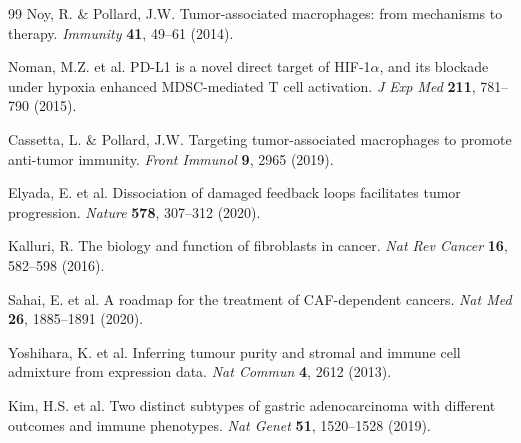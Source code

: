 \documentclass[12pt,twoside]{article}
\begin{document}
\begin{thebibliography}{99}
 Noy, R. \& Pollard, J.W. Tumor-associated macrophages: from mechanisms to therapy. \textit{Immunity} \textbf{41}, 49--61 (2014).

 Noman, M.Z. et al. PD-L1 is a novel direct target of HIF-1$\alpha$, and its blockade under hypoxia enhanced MDSC-mediated T cell activation. \textit{J Exp Med} \textbf{211}, 781--790 (2015).

 Cassetta, L. \& Pollard, J.W. Targeting tumor-associated macrophages to promote anti-tumor immunity. \textit{Front Immunol} \textbf{9}, 2965 (2019).

 Elyada, E. et al. Dissociation of damaged feedback loops facilitates tumor progression. \textit{Nature} \textbf{578}, 307--312 (2020).

 Kalluri, R. The biology and function of fibroblasts in cancer. \textit{Nat Rev Cancer} \textbf{16}, 582--598 (2016).

 Sahai, E. et al. A roadmap for the treatment of CAF-dependent cancers. \textit{Nat Med} \textbf{26}, 1885--1891 (2020).

 Yoshihara, K. et al. Inferring tumour purity and stromal and immune cell admixture from expression data. \textit{Nat Commun} \textbf{4}, 2612 (2013).

 Kim, H.S. et al. Two distinct subtypes of gastric adenocarcinoma with different outcomes and immune phenotypes. \textit{Nat Genet} \textbf{51}, 1520--1528 (2019).

\end{thebibliography}
\end{document}
